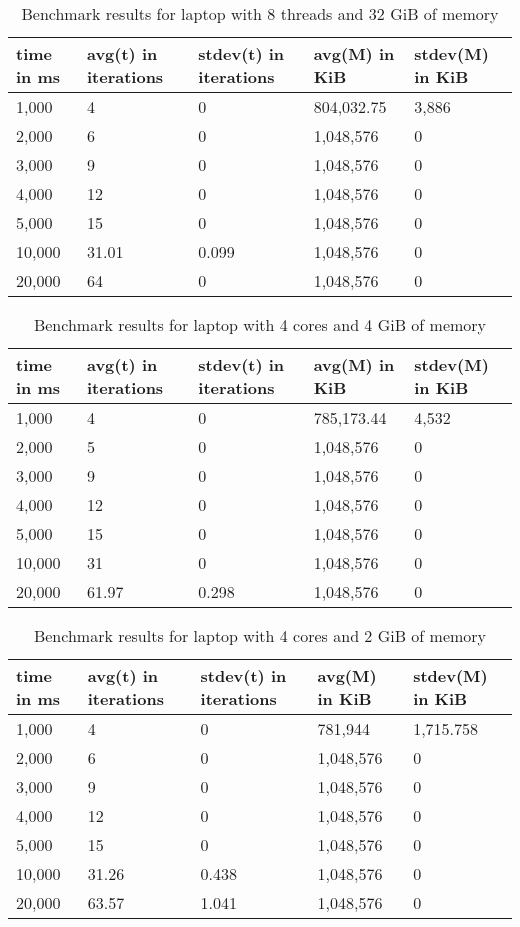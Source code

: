 \documentclass[nolof]{fithesis3}
\begin{document}
\noindent
\begin{table}
\caption{Benchmark results for laptop with 8 threads and 32 GiB of memory}
\label{tab:l8c32g}
\begin{tabularx}{\textwidth}{| X | X | X | X | X |}
\hline
time in ms & avg(t) in iterations & stdev(t) in iterations & avg(M) in KiB & stdev(M) in KiB\\
\hline
1,000 & 4 & 0 & 804,032.75 & 3,886\\
\hline
2,000 & 6 & 0 & 1,048,576 & 0\\
\hline
3,000 & 9 & 0 & 1,048,576 & 0\\
\hline
4,000 & 12 & 0 & 1,048,576 & 0\\
\hline
5,000 & 15 & 0 & 1,048,576 & 0\\
\hline
10,000 & 31.01 & 0.099 & 1,048,576 & 0\\
\hline
20,000 & 64 & 0 & 1,048,576 & 0\\
\hline
\end{tabularx}
\end{table}

\noindent
\begin{table}
\caption{Benchmark results for laptop with 4 cores and 4 GiB of memory}
\label{tab:l4c4g}
\begin{tabularx}{\textwidth}{| X | X | X | X | X |}
\hline
time in ms & avg(t)  in iterations & stdev(t) in iterations & avg(M) in KiB & stdev(M) in KiB\\
\hline
1,000 & 4 & 0 & 785,173.44 & 4,532\\
\hline
2,000 & 5 & 0 & 1,048,576 & 0\\
\hline
3,000 & 9 & 0 & 1,048,576 & 0\\
\hline
4,000 & 12 & 0 & 1,048,576 & 0\\
\hline
5,000 & 15 & 0 & 1,048,576 & 0\\
\hline
10,000 & 31 & 0 & 1,048,576 & 0\\
\hline
20,000 & 61.97 & 0.298 & 1,048,576 & 0\\
\hline
\end{tabularx}
\end{table}

\noindent
\begin{table}
\caption{Benchmark results for laptop with 4 cores and 2 GiB of memory}
\label{tab:l4c2g}
\begin{tabularx}{\textwidth}{| X | X | X | X | X |}
\hline
time in ms & avg(t)  in iterations & stdev(t) in iterations & avg(M) in KiB & stdev(M) in KiB\\
\hline
1,000 & 4 & 0 & 781,944 & 1,715.758\\
\hline
2,000 & 6 & 0 & 1,048,576 & 0\\
\hline
3,000 & 9 & 0 & 1,048,576 & 0\\
\hline
4,000 & 12 & 0 & 1,048,576 & 0\\
\hline
5,000 & 15 & 0 & 1,048,576 & 0\\
\hline
10,000 & 31.26 & 0.438 & 1,048,576 & 0\\
\hline
20,000 & 63.57 & 1.041 & 1,048,576 & 0\\
\hline
\end{tabularx}
\end{table}
\end{document}

